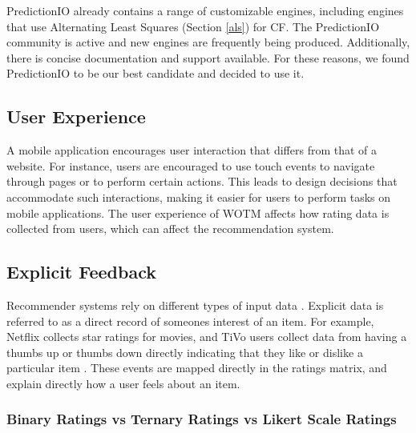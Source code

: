 PredictionIO already contains a range of customizable engines, including engines that use Alternating Least Squares (Section \ref{als}) for CF. The PredictionIO community is active and new engines are frequently being produced. Additionally, there is concise documentation and support available. For these reasons, we found PredictionIO to be our best candidate and decided to use it. 

\subsection{User Experience}

A mobile application encourages user interaction that differs from that of a website. For instance, users are encouraged to use touch events to navigate through pages or to perform certain actions. This leads to design decisions that accommodate such interactions, making it easier for users to perform tasks on mobile applications. The user experience of WOTM affects how rating data is collected from users, which can affect the recommendation system.

\subsection{Explicit Feedback}

Recommender systems rely on different types of input data \cite{koren2009matrix}. Explicit data is referred to as a direct record of someones interest of an item. For example, Netflix collects star ratings for movies, and TiVo users collect data from having a thumbs up or thumbs down directly indicating that they like or dislike a particular item \cite{koren2009matrix}. These events are mapped directly in the ratings matrix, and explain directly how a user feels about an item. 

\subsubsection{Binary Ratings vs Ternary Ratings vs Likert Scale Ratings}

